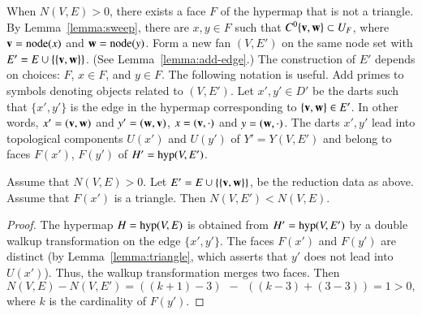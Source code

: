 

\begin{remark}\label{remark:reduction}
When $N(V,E)>0$, there exists a face $F$ of the hypermap that is not
a triangle.  By Lemma~\ref{lemma:sweep}, there are $x,y\in F$ such
that $C^0\{{\mathbf v},{\mathbf w}\}\subset U_F$, where ${\mathbf v} = {\operatorname{node}}(x)$ and ${\mathbf w} =
{\operatorname{node}}(y)$. Form a new fan $(V,E')$ on the same node set with $E' =
E\cup \{\{{\mathbf v},{\mathbf w}\}\}$.  (See Lemma~\ref{lemma:add-edge}.)  The
construction of $E'$ depends on choices: $F$, $x\in F$, and $y\in
F$.  The following notation is useful.  Add primes to symbols
denoting objects related to $(V,E')$.
Let $x',y'\in D'$ be the darts such that $\{x',y'\}$ is the edge in
the hypermap corresponding to $\{{\mathbf v},{\mathbf w}\}\in E'$.  In other words,
$x'=({\mathbf v},{\mathbf w})$ and $y'=({\mathbf w},{\mathbf v})$, $x=({\mathbf v},\cdot)$ and
$y=({\mathbf w},\cdot)$. The darts $x',y'$ lead into topological components
$U(x')$ and $U(y')$ of $Y'=Y(V,E')$ and belong to faces $F(x')$,
$F(y')$ of $H'={\operatorname{hyp}}(V,E')$.
\end{remark}

\begin{lemma}\label{lemma:lessN}
Assume that $N(V,E)>0$.  Let $E'=E\cup \{\{{\mathbf v},{\mathbf w}\}\}$, be the
reduction data as above.  Assume that $F(x')$ is a triangle. Then
$N(V,E')<N(V,E)$.
\end{lemma}


\begin{proof} The hypermap $H={\operatorname{hyp}}(V,E)$ is obtained from
$H'={\operatorname{hyp}}(V,E')$ by a double walkup transformation on the edge
$\{x',y'\}$.  The faces $F(x')$ and $F(y')$ are distinct (by
Lemma~\ref{lemma:triangle}, which asserts that $y'$ does not lead
into $U(x')$).  Thus, the walkup transformation merges two faces.
Then
\begin{displaymath}N(V,E) - N(V,E') = ((k+1)-3) ~~-~~ ((k-3) +
(3-3)) = 1 >0,\end{displaymath} where $k$ is the cardinality of
$F(y')$.
\end{proof}


